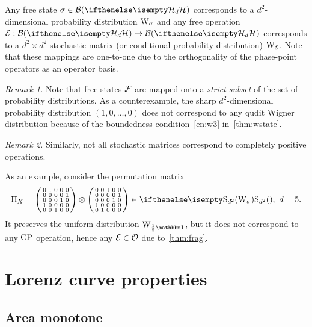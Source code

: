 Any free state $\sigma \in \cal{B}(\hd)$ corresponds to a $d^2$-dimensional probability distribution $\W{\sigma}$ and any free operation $\E: \cal{B}(\hd) \mapsto \cal{B}(\hd)$ corresponds to a $d^2 \times d^2$ stochastic matrix (or conditional probability distribution) $\W{\E}$.
Note that these mappings are one-to-one due to the orthogonality of the phase-point operators as an operator basis.

\emph{Remark 1.} Note that free states $\mathcal{F}$ are mapped onto a \emph{strict subset} of the set of probability distributions.
As a counterexample, the sharp $d^2$-dimensional probability distribution $(1, 0, \dots, 0)$ does not correspond to any qudit Wigner distribution because of the boundedness condition~\ref{en:w3} in~\cref{thm:wstate}.

\emph{Remark 2.} Similarly, not all stochastic matrices correspond to completely positive operations.

As an example, consider the permutation matrix
\begin{equation}
    \Pi_X = \begin{psmallmatrix}
        0 & 1 & 0 & 0 & 0 \\
        0 & 0 & 0 & 0 & 1 \\
        0 & 0 & 0 & 1 & 0 \\
        1 & 0 & 0 & 0 & 0 \\
        0 & 0 & 1 & 0 & 0
    \end{psmallmatrix} \otimes \begin{psmallmatrix}
        0 & 0 & 1 & 0 & 0 \\
        0 & 0 & 0 & 0 & 1 \\
        0 & 0 & 0 & 1 & 0 \\
        1 & 0 & 0 & 0 & 0 \\
        0 & 1 & 0 & 0 & 0    
    \end{psmallmatrix} \in \stochw,\ d=5.
\end{equation}
It preserves the uniform distribution $\W{\frac{1}{5}\id}{}$, but it does not correspond to any ${\rm{CP}}$ operation, hence any $\mathcal{E} \in \mathcal{O}$ due to~\cref{thm:frag}.

\section{Lorenz curve properties}
\label{app:lc_properties}

\subsection{Area monotone}\label{app:areamono}

